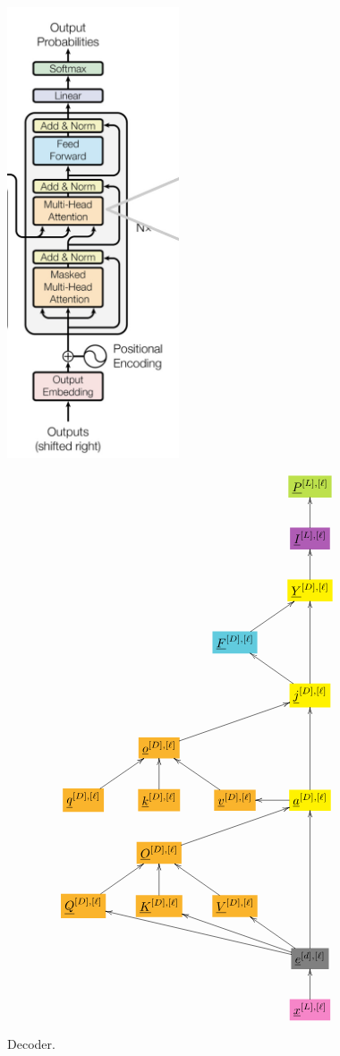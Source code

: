 \documentclass[12pt]{article}
\begin{document}
\begin{figure}[h!]\centering
\begin{minipage}{.5\linewidth}
\includegraphics[width=2in]{decoder.jpg}
\end{minipage}%
\begin{minipage}{.5\linewidth}
$$\xymatrix{
&&&*+[F*:SpringGreen]{\underline{P}^{[L],[\ell]}}
\\
&&&*+[F*:Orchid]{\underline{I}^{[L],[\ell]}}\ar[u]
\\
&&&*+[F*:yellow]{\underline{Y}^{[D], [\ell]}}\ar[u]
\\
&&*+[F*:SkyBlue]{\underline{F}^{[D], [\ell]}}\ar[ur]&
\\
&&&*+[F*:yellow]{\underline{j}^{[D], [\ell]}}\ar[ul]\ar[uu]
\\
&*+[F*:Dandelion]{\underline{o}^{[D],[\ell]}}\ar[urr]&&
\\
*+[F*:Dandelion]{\underline{q}^{[D], [\ell]}}\ar[ur]&*+[F*:Dandelion]{\underline{k}^{[D], [\ell]}}\ar[u]&*+[F*:Dandelion]{\underline{v}^{[D], [\ell]}}\ar[ul]&*+[F*:yellow]{\underline{a}^{[D], [\ell]}}\ar[uu]\ar[l]
\\
&*+[F*:Dandelion]{\underline{O}^{[D],[\ell]}}\ar[urr]&&
\\
*+[F*:Dandelion]{\underline{Q}^{[D], [\ell]}}\ar[ur]&*+[F*:Dandelion]{\underline{K}^{[D], [\ell]}}\ar[u]&*+[F*:Dandelion]{\underline{V}^{[D], [\ell]}}\ar[ul]&
\\
&&&*+[F*:gray]{\underline{e}^{[d],[\ell]}}\ar[ull]\ar[ulll]\ar[ul]\ar[uuu]
\\
&&&*+[F*:Lavender]{\underline{x}^{[L],[\ell]}}\ar[u]
}$$
\end{minipage}
\caption{Decoder.}
\label{fig-texnn-for-decoder}
\end{figure}
\end{document}
